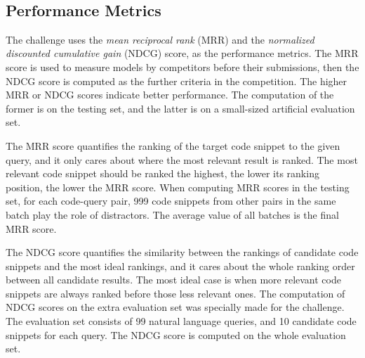 \documentclass[conference]{IEEEtran}
\begin{document}
\begin{table}[thb]
\centering
\caption{Statistics of Code-Query Pairs in the Corpus}
~\\
\label{tab:0-corpus}
\end{table}
 
\subsection{Performance Metrics}

The challenge uses the \emph{mean reciprocal rank} (MRR) and the \emph{normalized discounted cumulative gain} (NDCG) score, as the performance metrics. The MRR score is used to measure models by competitors before their submissions, then the NDCG score is computed as the further criteria in the competition. The higher MRR or NDCG scores indicate better performance. The computation of the former is on the testing set, and the latter is on a small-sized artificial evaluation set.

The MRR score quantifies the ranking of the target code snippet to the given query, and it only cares about where the most relevant result is ranked. The most relevant code snippet should be ranked the highest, the lower its ranking position, the lower the MRR score. When computing MRR scores in the testing set, for each code-query pair, 999 code snippets from other pairs in the same batch play the role of distractors. The average value of all batches is the final MRR score.





The NDCG score quantifies the similarity between the rankings of candidate code snippets and the most ideal rankings, and it cares about the whole ranking order between all candidate results. The most ideal case is when more relevant code snippets are always ranked before those less relevant ones. The computation of NDCG scores on the extra evaluation set was specially made for the challenge. The evaluation set consists of 99 natural language queries, and 10 candidate code snippets for each query. The NDCG score is computed on the whole evaluation set.
\end{document}
